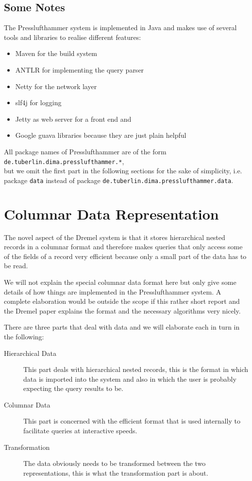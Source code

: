 \subsection{Some Notes}
The Presslufthammer system is implemented in Java and makes use of several tools
and libraries to realise different features:

\begin{itemize}
  \item Maven \cite{maven} for the build system
  \item ANTLR \cite{antlr} for implementing the query parser
  \item Netty \cite{netty} for the network layer
  \item slf4j \cite{slf4j} for logging
  \item Jetty \cite{jetty} as web server for a front end and
  \item Google guava libraries \cite{guava} because they are just plain helpful
\end{itemize}

All package names of Presslufthammer are of the form\\
\texttt{de.tuberlin.dima.presslufthammer.*},\\
but we omit the first part in the following sections for the sake of simplicity,
i.e. package \texttt{data} instead of package
\texttt{de.tuberlin.dima.presslufthammer.data}.


\section{Columnar Data Representation}
The novel aspect of the Dremel system is that it stores hierarchical nested
records in a columnar format and therefore makes queries that only
access some of the fields of a record very efficient because only a small
part of the data has to be read.

We will not explain the special columnar data format here but only give
some details of how things are implemented in the Presslufthammer
system. A complete elaboration would be outside the scope if this
rather short report and the Dremel paper \cite{melnik2010dremel}
explains the format and the necessary algorithms very nicely.

There are three parts that deal with data and we will elaborate each in
turn in the following:

\begin{description}
  \item[Hierarchical Data] This part deals with hierarchical nested records, this
    is the format in which data is imported into the system and also in which
    the user is probably expecting the query results to be.
  \item[Columnar Data] This part is concerned with the efficient format that is
    used internally to facilitate queries at interactive speeds.
  \item[Transformation] The data obviously needs to be transformed between the two
    representations, this is what the transformation part is about.
\end{description}

